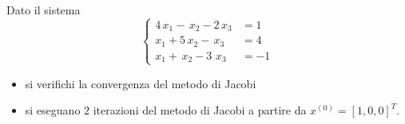 Dato il sistema
\[ \left \{
\begin{array}{ll}
4\,  x_1-\, x_2-2\,x_3 &=1\\
x_1+5\, x_2 -\, x_3&=4 \\
x_1+\,x_2 - 3\, \,x_3&=-1
\end{array}
\right.
\]
\begin{itemize}
\item si verifichi la convergenza del metodo di Jacobi
\item si eseguano $2$ iterazioni del metodo di Jacobi a partire da $x^{(0)}=[1, 0, 0]^T.$
\end{itemize}